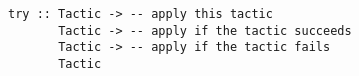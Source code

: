 \begin{verbatim}
try :: Tactic -> -- apply this tactic
       Tactic -> -- apply if the tactic succeeds
       Tactic -> -- apply if the tactic fails
       Tactic
\end{verbatim}



